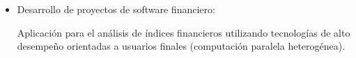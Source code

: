 \frame
{
\frametitle{}
 \begin{itemize}
            \item Desarrollo de proyectos de software financiero:
		 
 Aplicaci\'on para el an\'alisis de \'indices financieros utilizando tecnolog\'ias 
			de alto desempe\~no orientadas a usuarios finales (computaci\'on paralela heterog\'enea).
	      
\end{itemize}	     
\begin{center}
\end{center}
}

